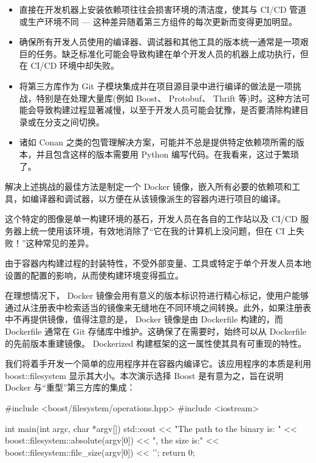 \begin{itemize}
\item
直接在开发机器上安装依赖项往往会损害环境的清洁度，使其与 CI/CD 管道或生产环境不同 --- 这种差异随着第三方组件的每次更新而变得更加明显。

\item
确保所有开发人员使用的编译器、调试器和其他工具的版本统一通常是一项艰巨的任务。缺乏标准化可能会导致构建在单个开发人员的机器上成功执行，但在 CI/CD 环境中却失败。

\item
将第三方库作为 Git 子模块集成并在项目源目录中进行编译的做法是一项挑战，特别是在处理大量库(例如 Boost、 Protobuf、 Thrift 等)时。这种方法可能会导致构建过程显著减慢，以至于开发人员可能会犹豫，是否要清除构建目录或在分支之间切换。

\item
诸如 Conan 之类的包管理解决方案，可能并不总是提供特定依赖项所需的版本，并且包含这样的版本需要用 Python 编写代码。在我看来，这过于繁琐了。
\end{itemize}


解决上述挑战的最佳方法是制定一个 Docker 镜像，嵌入所有必要的依赖项和工具，如编译器和调试器，以方便在从该镜像派生的容器内进行项目的编译。

这个特定的图像是单一构建环境的基石，开发人员在各自的工作站以及 CI/CD 服务器上统一使用该环境，有效地消除了“它在我的计算机上没问题，但在 CI 上失败！”这种常见的差异。

由于容器内构建过程的封装特性，不受外部变量、工具或特定于单个开发人员本地设置的配置的影响，从而使构建环境变得孤立。

在理想情况下， Docker 镜像会用有意义的版本标识符进行精心标记，使用户能够通过从注册表中检索适当的镜像来无缝地在不同环境之间转换。此外，如果注册表中不再提供镜像，值得注意的是， Docker 镜像是由 Dockerfile 构建的，而 Dockerfile 通常在 Git 存储库中维护。这确保了在需要时，始终可以从 Dockerfile 的先前版本重建镜像。 Dockerized 构建框架的这一属性使其具有可重现的特性。


我们将着手开发一个简单的应用程序并在容器内编译它。该应用程序的本质是利用 boost::filesystem 显示其大小。本次演示选择 Boost 是有意为之，旨在说明 Docker 与“重型”第三方库的集成：

\begin{cpp}
#include <boost/filesystem/operations.hpp>
#include <iostream>

int main(int argc, char *argv[]) {
    std::cout << "The path to the binary is: "
              << boost::filesystem::absolute(argv[0])
              << ", the size is:" << boost::filesystem::file_size(argv[0]) << '\n';
    return 0;
}
\end{cpp}

